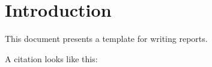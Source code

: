\section{Introduction}\label{ssec:introduction}

This document presents a template for writing reports.

A citation looks like this: \cite{10285163}
